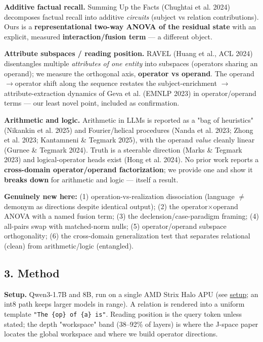 \textbf{Additive factual recall.} Summing Up the Facts (Chughtai et al.
2024) decomposes factual recall into additive \emph{circuits} (subject
vs relation contributions). Ours is a \textbf{representational two-way
ANOVA of the residual state} with an explicit, measured
\textbf{interaction/fusion term} --- a different object.

\textbf{Attribute subspaces / reading position.} RAVEL (Huang et al.,
ACL 2024) disentangles multiple \emph{attributes of one entity} into
subspaces (operators sharing an operand); we measure the orthogonal
axis, \textbf{operator vs operand}. The operand\ensuremath{\to}operator shift along the
sequence restates the subject-enrichment \ensuremath{\to} attribute-extraction dynamics
of Geva et al. (EMNLP 2023) in operator/operand terms --- our least
novel point, included as confirmation.

\textbf{Arithmetic and logic.} Arithmetic in LLMs is reported as a "bag
of heuristics" (Nikankin et al. 2025) and Fourier/helical procedures
(Nanda et al. 2023; Zhong et al. 2023; Kantamneni \& Tegmark 2025), with
the operand \emph{value} cleanly linear (Gurnee \& Tegmark 2024). Truth
is a steerable direction (Marks \& Tegmark 2023) and logical-operator
heads exist (Hong et al. 2024). No prior work reports a
\textbf{cross-domain operator/operand factorization}; we provide one and
show it \textbf{breaks down} for arithmetic and logic --- itself a
result.

\textbf{Genuinely new here:} (1) operation-vs-realization dissociation
(language \ensuremath{\neq} demonym as directions despite identical output); (2) the
operator\ensuremath{\times}operand ANOVA with a named fusion term; (3) the
declension/case-paradigm framing; (4) all-pairs swap with matched-norm
nulls; (5) operator/operand subspace orthogonality; (6) the cross-domain
generalization test that separates relational (clean) from
arithmetic/logic (entangled).

\subsection{3. Method}\label{3-method}

\textbf{Setup.} Qwen3-1.7B and 8B, run on a single AMD Strix Halo APU
(see \href{setup.md}{setup}; an int8 path keeps larger models in range).
A relation is rendered into a uniform template
\texttt{"The\ \{op\}\ of\ \{a\}\ is"}. Reading position is the query
token unless stated; the depth "workspace" band (38--92\% of layers) is
where the J-space paper locates the global workspace and where we build
operator directions.

